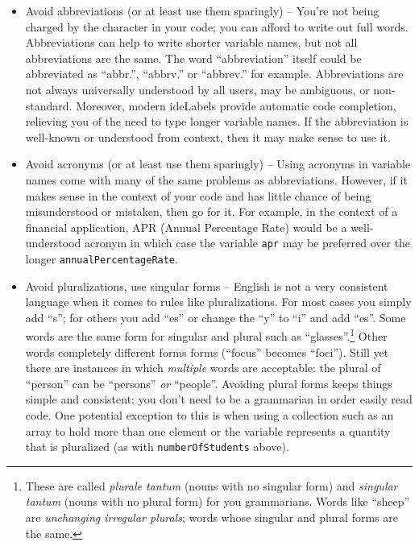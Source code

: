 \begin{itemize}
  \item Avoid abbreviations (or at least use them sparingly) -- You're not being charged 
  	by the character in your code; you can afford to write out full words.  Abbreviations
	can help to write shorter variable names, but not all abbreviations are the same. 
	The word ``abbreviation'' itself could be abbreviated as ``abbr.'', ``abbrv.'' or ``abbrev.''
	for example.  Abbreviations are not always universally understood by all users, may be
	ambiguous, or non-standard.  Moreover, modern \glspl{ideLabel} provide automatic code 
	completion, relieving you of the need to type longer variable names.  If the abbreviation 
	is well-known or understood from context, then it may make sense to use it.
  \item Avoid acronyms (or at least use them sparingly) -- Using acronyms in variable
  	names come with many of the same problems as abbreviations.  However, if it 
	makes sense in the context of your code and has little chance of being misunderstood
	or mistaken, then go for it.  For example, in the context of a financial application, 
	APR (Annual Percentage Rate) would be a well-understood acronym in which case
	the variable \texttt{apr} may be preferred over the longer \texttt{annualPercentageRate}.
  \item Avoid pluralizations, use singular forms -- English is not a very consistent language when it comes to 
  	rules like pluralizations.  For most cases you simply add ``s''; for others you add ``es'' or change the ``y'' to
	``i'' and add ``es''.  Some words are the same form for singular and plural such as ``glasses''.\footnote{These
	are called \emph{plurale tantum} (nouns with no singular form) and \emph{singular tantum} (nouns with
	no plural form) for you grammarians.  Words like ``sheep'' are \emph{unchanging irregular plurals}; words
	whose singular and plural forms are the same.}  Other words completely different forms forms 
	(``focus'' becomes ``foci'').  Still yet there are instances in which \emph{multiple} words are acceptable:
	the plural of ``person'' can be ``persons'' \emph{or} ``people''.  Avoiding plural forms keeps things simple
	and consistent: you don't need to be a grammarian in order easily read code.  One potential 
	exception to this is when using a collection such as an array to hold more than one element or
	the variable represents a quantity that is pluralized (as with \texttt{numberOfStudents} above).
\end{itemize}

